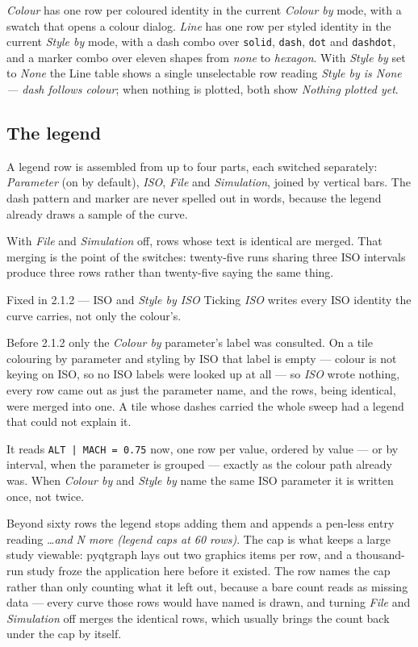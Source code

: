 \documentclass[11pt,a4paper,oneside]{report}
\newcommand{\appver}{2.1.2}
\newcommand{\code}[1]{\texttt{#1}}
\begin{document}
\emph{Colour} has one row per coloured identity in the current \emph{Colour by}
mode, with a swatch that opens a colour dialog. \emph{Line} has one row per
styled identity in the current \emph{Style by} mode, with a dash combo over
\code{solid}, \code{dash}, \code{dot} and \code{dashdot}, and a marker combo over
eleven shapes from \emph{none} to \emph{hexagon}. With \emph{Style by} set to
\emph{None} the Line table shows a single unselectable row reading \emph{Style by
is None --- dash follows colour}; when nothing is plotted, both show
\emph{Nothing plotted yet}.

\subsection{The legend}
\label{sec:legend}

A legend row is assembled from up to four parts, each switched separately:
\emph{Parameter} (on by default), \emph{ISO}, \emph{File} and \emph{Simulation},
joined by vertical bars. The dash pattern and marker are never spelled out in
words, because the legend already draws a sample of the curve.

With \emph{File} and \emph{Simulation} off, rows whose text is identical are
merged. That merging is the point of the switches: twenty-five runs sharing three
ISO intervals produce three rows rather than twenty-five saying the same thing.

\begin{aoenew}{Fixed in \appver{} --- ISO and \emph{Style by ISO}}
Ticking \emph{ISO} writes every ISO identity the curve carries, not only the
colour's.

Before \appver{} only the \emph{Colour by} parameter's label was consulted. On a
tile colouring by parameter and styling by ISO that label is empty --- colour is
not keying on ISO, so no ISO labels were looked up at all --- so \emph{ISO} wrote
nothing, every row came out as just the parameter name, and the rows, being
identical, were merged into one. A tile whose dashes carried the whole sweep had
a legend that could not explain it.

It reads \code{ALT | MACH = 0.75} now, one row per value, ordered by value ---
or by interval, when the parameter is grouped --- exactly as the colour path
already was. When \emph{Colour by} and \emph{Style by} name the same ISO
parameter it is written once, not twice.
\end{aoenew}

Beyond sixty rows the legend stops adding them and appends a pen-less entry
reading \emph{\ldots and N more (legend caps at 60 rows)}. The cap is what
keeps a large study viewable: pyqtgraph lays out two graphics items per row, and
a thousand-run study froze the application here before it existed. The row names
the cap rather than only counting what it left out, because a bare count reads
as missing data --- every curve those rows would have named is drawn, and
turning \emph{File} and \emph{Simulation} off merges the identical rows, which
usually brings the count back under the cap by itself.
\end{document}
